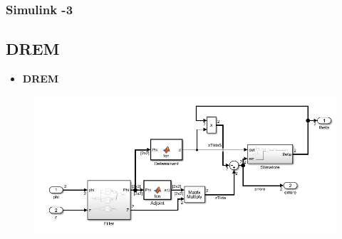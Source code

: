 \documentclass{beamer}
\begin{document}
\begin{frame}
	\frametitle{Simulink -3}%
	\subsection{DREM}
	\begin{itemize}
		\item \textbf{DREM}
	\end{itemize}
	\begin{figure}
		\includegraphics[scale=0.5]{2022-05-09-17-09-53.png} %
	\end{figure}
\end{frame}
\end{document}
